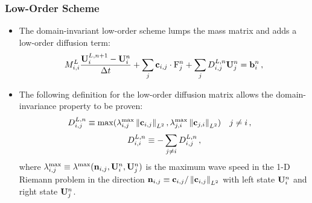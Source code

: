 \documentclass{beamer} \useoutertheme{infolines}
\begin{document}
\begin{frame}
\frametitle{Low-Order Scheme}

\begin{itemize}
  \item The domain-invariant low-order scheme lumps the mass matrix and adds
    a low-order diffusion term:
    \begin{equation}
      \lumpedmassentry
        \frac{\solutionvector_i^{L,n+1}-\solutionvector_i^n}{\dt}
        + \sum_j\gradiententry\cdot\consfluxinterpolant_j^n
        + \sum_j\diffusionmatrixletter\ij^{L,n}\solutionvector_j^n
        = \ssrhs_i^n \eqc
    \end{equation}
  \item The following definition for the low-order diffusion matrix allows
    the domain-invariance property to be proven:
    \begin{equation}
      \diffusionmatrixletter^{L,n}\ij \equiv
        \max(\maxwavespeed\ij\ltwonorm{\mathbf{\gradientmatrixletter}\ij},
          \maxwavespeed\ji\ltwonorm{\mathbf{\gradientmatrixletter}\ji})
      \quad j\ne i \eqc \quad
    \end{equation}
    \begin{equation}
      D^{L,n}_{i,i} \equiv
        -\sum\limits_{j\ne i}D^{L,n}_{i,j}
      \,,
    \end{equation}
   where $\maxwavespeed\ij \equiv \maxwavespeed(
   \normalvector\ij,\solutionvector_i^n,\solutionvector_j^n)$
   is the maximum wave speed in the 1-D Riemann problem in the direction
   $\mathbf{n}_{i,j} \equiv \mathbf{c}_{i,j} /
   \left\|\mathbf{c}_{i,j}\right\|_{L^2}$
   with left state $\mathbf{U}_i^n$ and right state $\mathbf{U}_j^n$.
\end{itemize}

\end{frame}
\end{document}
